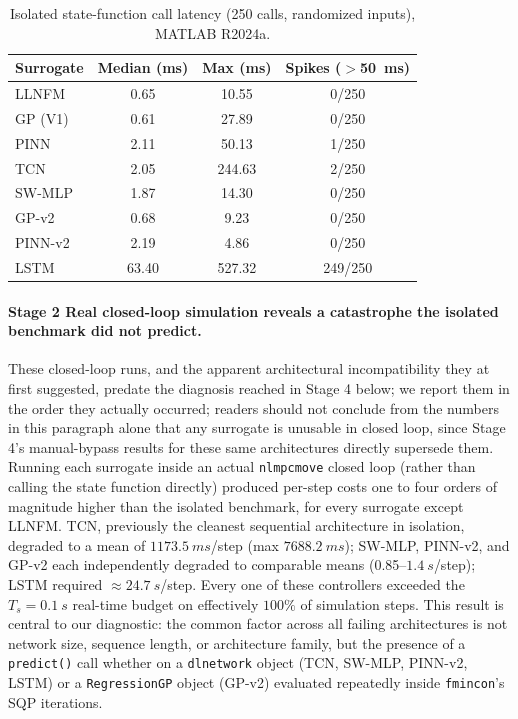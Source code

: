 \begin{table}[H]
\centering
\caption{Isolated state-function call latency (250 calls, randomized
inputs), MATLAB R2024a.}
\label{tab:isolated_benchmark}
\begin{tabular}{lccc}
\toprule
Surrogate & Median (ms) & Max (ms) & Spikes ($>$\SI{50}{ms}) \\
\midrule
LLNFM   & 0.65  & 10.55  & 0/250 \\
GP (V1) & 0.61  & 27.89  & 0/250 \\
PINN    & 2.11  & 50.13  & 1/250 \\
TCN     & 2.05  & 244.63 & 2/250 \\
SW-MLP  & 1.87  & 14.30  & 0/250 \\
GP-v2   & 0.68  & 9.23   & 0/250 \\
PINN-v2 & 2.19  & 4.86   & 0/250 \\
LSTM    & 63.40 & 527.32 & 249/250 \\
\bottomrule
\end{tabular}
\end{table}

\paragraph{Stage 2  Real closed-loop simulation reveals a
catastrophe the isolated benchmark did not predict.} These closed-loop
runs, and the apparent architectural incompatibility they at first
suggested, predate the diagnosis reached in Stage 4 below; we report
them in the order they actually occurred; readers should not conclude
from the numbers in this paragraph alone that any surrogate is
unusable in closed loop, since Stage 4's manual-bypass results for
these same architectures directly supersede them. Running each
surrogate inside an actual \texttt{nlmpcmove} closed loop (rather than
calling the state function directly) produced per-step costs one to
four orders of magnitude higher than the isolated benchmark, for every
surrogate except LLNFM. TCN, previously the cleanest sequential
architecture in isolation, degraded to a mean of $\SI{1173.5}{ms}$/step
(max $\SI{7688.2}{ms}$); SW-MLP, PINN-v2, and GP-v2 each independently
degraded to comparable means (0.85--$\SI{1.4}{s}$/step); LSTM required
$\approx\SI{24.7}{s}$/step. Every one of these controllers exceeded the
$T_s=\SI{0.1}{s}$ real-time budget on effectively $100\%$ of simulation
steps. This result is central to our diagnostic: the common factor
across all failing architectures is not network size, sequence length,
or architecture family, but the presence of a \texttt{predict()} call
 whether on a \texttt{dlnetwork} object (TCN, SW-MLP, PINN-v2, LSTM)
or a \texttt{RegressionGP} object (GP-v2)  evaluated repeatedly
inside \texttt{fmincon}'s SQP iterations.

